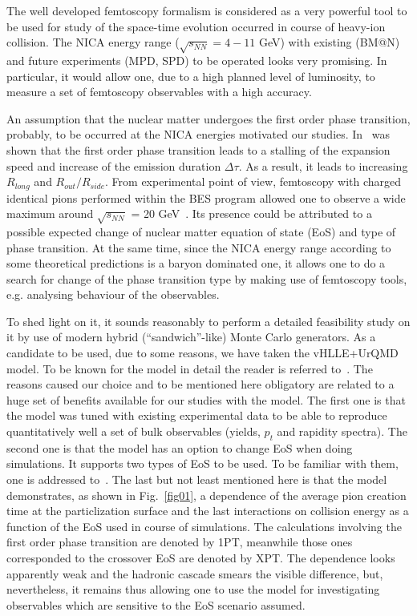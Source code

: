 \documentclass[a4paper]{panl}
\begin{document}
The well developed femtoscopy formalism is considered as a very powerful tool to be used for study of the space-time evolution occurred in course of heavy-ion collision.
The NICA energy range ($\sqrt{s_{NN}} = 4 - 11$ GeV) with existing (BM@N) and future experiments (MPD, SPD) to be operated looks very promising.
In particular, it would allow one, due to a high planned level of luminosity, to measure a set of femtoscopy observables with a high accuracy.     

An assumption that the nuclear matter undergoes the first order phase transition, probably, to be occurred at the NICA energies motivated our studies.
In~\cite{Rischke:1996em} was shown that the first order phase transition leads to a stalling of the expansion speed and increase of the emission duration $\Delta \tau$.
As a result, it leads to increasing $R_{long}$ and $R_{out} / R_{side}$.
From experimental point of view, femtoscopy with charged identical pions performed within the BES program allowed one to observe a wide maximum around
$\sqrt{s_{NN}}$ = 20 GeV~\cite{Adamczyk:2014mxp}. Its presence could be attributed to a possible expected change of nuclear matter equation of state (EoS) and type of phase transition.
At the same time, since the NICA energy range according to some theoretical predictions is a baryon dominated one, it allows one to do a search for change of the phase transition type
by making use of femtoscopy tools, e.g. analysing behaviour of the observables.

To shed light on it, it sounds reasonably to perform a detailed feasibility study on it by use of modern
hybrid (``sandwich''-like) Monte Carlo generators. As a candidate to be used, due to some reasons, we have taken the vHLLE+UrQMD model. To be known for the model in detail the reader
is referred to~\cite{Karpenko:2015xea}. The reasons caused our choice and to be mentioned here obligatory are related to a huge set of benefits available for our studies
with the model. The first one is that the model was tuned with existing experimental data to be able to reproduce quantitatively well a set of bulk observables
(yields, $p_{t}$ and rapidity spectra). The second one is that the model has an option to change EoS when doing simulations. It supports two types of EoS to be used.
To be familiar with them, one is addressed to~\cite{Steinheimer:2010ib, Kolb:2000sd}. The last but not least mentioned here is that the model demonstrates, as shown
in Fig.~\ref{fig01}, a dependence of the average pion creation time at the particlization surface and the last interactions on collision energy as a function of the EoS used
in course of simulations. The calculations involving the first order phase transition are denoted by 1PT, meanwhile those ones corresponded to the crossover EoS are denoted by XPT.
The dependence looks apparently weak and the hadronic cascade smears the visible difference, but, nevertheless, it remains thus allowing one to use the model for investigating
observables which are sensitive to the EoS scenario assumed. 
\end{document}
